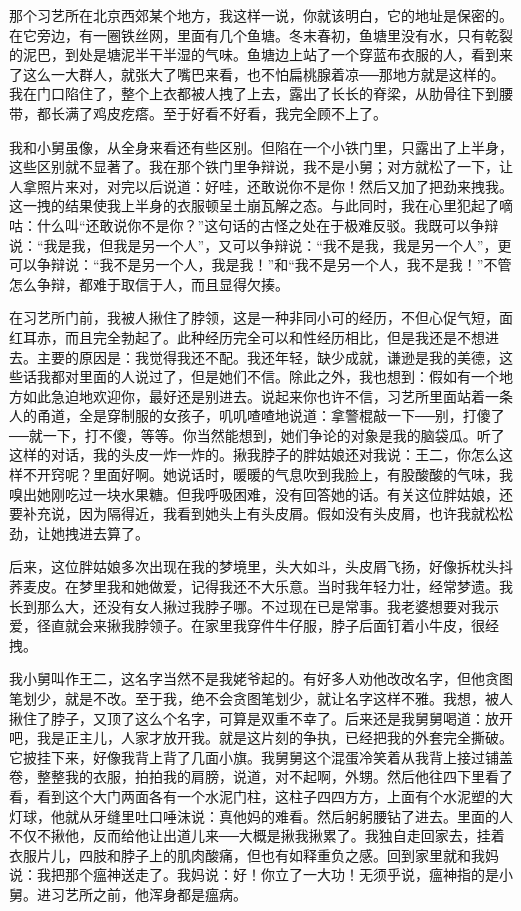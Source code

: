 那个习艺所在北京西郊某个地方，我这样一说，你就该明白，它的地址是保密的。在它旁边，有一圈铁丝网，里面有几个鱼塘。冬末春初，鱼塘里没有水，只有乾裂的泥巴，到处是塘泥半干半湿的气味。鱼塘边上站了一个穿蓝布衣服的人，看到来了这么一大群人，就张大了嘴巴来看，也不怕扁桃腺着凉──那地方就是这样的。我在门口陷住了，整个上衣都被人拽了上去，露出了长长的脊梁，从肋骨往下到腰带，都长满了鸡皮疙瘩。至于好看不好看，我完全顾不上了。 

我和小舅虽像，从全身来看还有些区别。但陷在一个小铁门里，只露出了上半身，这些区别就不显著了。我在那个铁门里争辩说，我不是小舅；对方就松了一下，让人拿照片来对，对完以后说道：好哇，还敢说你不是你！然后又加了把劲来拽我。这一拽的结果使我上半身的衣服顿呈土崩瓦解之态。与此同时，我在心里犯起了嘀咕：什么叫“还敢说你不是你？”这句话的古怪之处在于极难反驳。我既可以争辩说：“我是我，但我是另一个人”，又可以争辩说：“我不是我，我是另一个人”，更可以争辩说：“我不是另一个人，我是我！”和“我不是另一个人，我不是我！”不管怎么争辩，都难于取信于人，而且显得欠揍。 

在习艺所门前，我被人揪住了脖领，这是一种非同小可的经历，不但心促气短，面红耳赤，而且完全勃起了。此种经历完全可以和性经历相比，但是我还是不想进去。主要的原因是：我觉得我还不配。我还年轻，缺少成就，谦逊是我的美德，这些话我都对里面的人说过了，但是她们不信。除此之外，我也想到：假如有一个地方如此急迫地欢迎你，最好还是别进去。说起来你也许不信，习艺所里面站着一条人的甬道，全是穿制服的女孩子，叽叽喳喳地说道：拿警棍敲一下──别，打傻了──就一下，打不傻，等等。你当然能想到，她们争论的对象是我的脑袋瓜。听了这样的对话，我的头皮一炸一炸的。揪我脖子的胖姑娘还对我说：王二，你怎么这样不开窍呢？里面好啊。她说话时，暖暖的气息吹到我脸上，有股酸酸的气味，我嗅出她刚吃过一块水果糖。但我呼吸困难，没有回答她的话。有关这位胖姑娘，还要补充说，因为隔得近，我看到她头上有头皮屑。假如没有头皮屑，也许我就松松劲，让她拽进去算了。 

后来，这位胖姑娘多次出现在我的梦境里，头大如斗，头皮屑飞扬，好像拆枕头抖荞麦皮。在梦里我和她做爱，记得我还不大乐意。当时我年轻力壮，经常梦遗。我长到那么大，还没有女人揪过我脖子哪。不过现在已是常事。我老婆想要对我示爱，径直就会来揪我脖领子。在家里我穿件牛仔服，脖子后面钉着小牛皮，很经拽。 

我小舅叫作王二，这名字当然不是我姥爷起的。有好多人劝他改改名字，但他贪图笔划少，就是不改。至于我，绝不会贪图笔划少，就让名字这样不雅。我想，被人揪住了脖子，又顶了这么个名字，可算是双重不幸了。后来还是我舅舅喝道：放开吧，我是正主儿，人家才放开我。就是这片刻的争执，已经把我的外套完全撕破。它披挂下来，好像我背上背了几面小旗。我舅舅这个混蛋冷笑着从我背上接过铺盖卷，整整我的衣服，拍拍我的肩膀，说道，对不起啊，外甥。然后他往四下里看了看，看到这个大门两面各有一个水泥门柱，这柱子四四方方，上面有个水泥塑的大灯球，他就从牙缝里吐口唾沫说：真他妈的难看。然后躬躬腰钻了进去。里面的人不仅不揪他，反而给他让出道儿来──大概是揪我揪累了。我独自走回家去，挂着衣服片儿，四肢和脖子上的肌肉酸痛，但也有如释重负之感。回到家里就和我妈说：我把那个瘟神送走了。我妈说：好！你立了一大功！无须乎说，瘟神指的是小舅。进习艺所之前，他浑身都是瘟病。 

